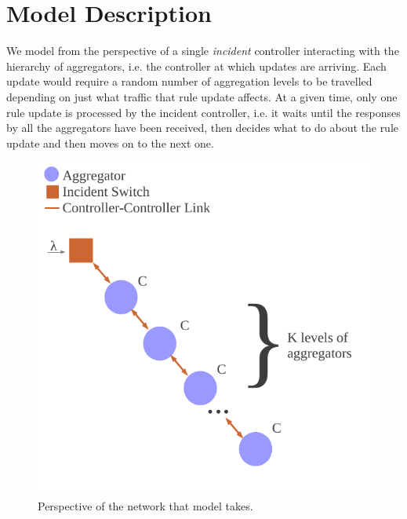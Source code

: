 \documentclass[conference]{IEEEtran}
\begin{document}


\section{Model Description}
We model from the perspective of a single \textit{incident} controller interacting with the hierarchy of aggregators, i.e. the controller at which updates are arriving. Each update would require a random number of aggregation levels to be travelled depending on just what traffic that rule update affects. At a given time, only one rule update is processed by the incident controller, i.e. it waits until the responses by all the aggregators have been received, then decides what to do about the rule update and then moves on to the next one.


 \begin{figure}[h]
 \centering
 \includegraphics[scale=0.8]{model_perspective}
 \caption{Perspective of the network that model takes.}
 \label{fig:alternative_network_view}
 \end{figure}
\end{document}
